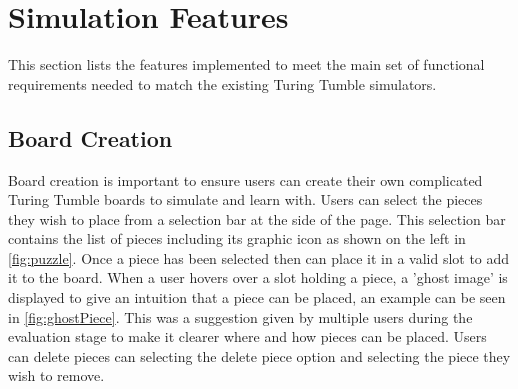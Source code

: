 \documentclass{l4proj}
\begin{document}


\section{Simulation Features}
This section lists the features implemented to meet the main set of functional requirements needed to match the existing Turing Tumble simulators.

\subsection{Board Creation}
Board creation is important to ensure users can create their own complicated Turing Tumble boards to simulate and learn with. Users can select the pieces they wish to place from a selection bar at the side of the page. This selection bar contains the list of pieces including its graphic icon as shown on the left in \ref{fig:puzzle}. Once a piece has been selected then can place it in a valid slot to add it to the board. When a user hovers over a slot holding a piece, a 'ghost image' is displayed to give an intuition that a piece can be placed, an example can be seen in \ref{fig:ghostPiece}. This was a suggestion given by multiple users during the evaluation stage to make it clearer where and how pieces can be placed. Users can delete pieces can selecting the delete piece option and selecting the piece they wish to remove.
\end{document}
